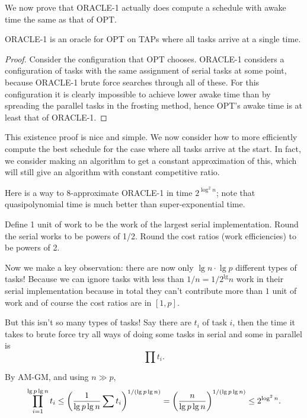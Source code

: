 We now prove that ORACLE-1 actually does compute a schedule with
awake time the same as that of OPT.
\begin{lemma}
  \label{lem:frosting} 
  ORACLE-1 is an oracle for OPT on TAPs where all tasks arrive at a single time.
\end{lemma}
\begin{proof}
  Consider the configuration that OPT chooses. ORACLE-1 considers
  a configuration of tasks with the same assignment of serial
  tasks at some point, because ORACLE-1 brute force searches
  through all of these. For this configuration it is clearly
  impossible to achieve lower awake time than by spreading the
  parallel tasks in the frosting method, hence OPT's awake time
  is at least that of ORACLE-1.
\end{proof}

This existence proof is nice and simple. We now consider how to
more efficiently compute the best schedule for the case where all
tasks arrive at the start. In fact, we consider making an
algorithm to get a constant approximation of this, which will
still give an algorithm with constant competitive ratio.


Here is a way to 8-approximate ORACLE-1 in time $2^{\log^2 n}$;
note that quasipolynomial time is much better than super-exponential time.

Define 1 unit of work to be the work of the largest serial
implementation.
Round the serial works to be powers of 1/2.
Round the cost ratios (work efficiencies) to be powers of 2. 

Now we make a key observation: there are now only 
$\lg n \cdot \lg p$ different types of tasks!
Because we can ignore tasks with less than $1/n = 1/2^\lg n$ work
in their serial implementation because in total they can't
contribute more than $1$ unit of work 
and of course the cost ratios are in $[1,p]$.

But this isn't so many types of tasks! 
Say there are $t_i$ of task $i$, 
then the time it takes to brute force try all ways of doing some tasks in serial and some in parallel is 
$$\prod t_i.$$

By AM-GM, and using $n \gg p$,
$$\prod_{i=1}^{\lg p \lg n} t_i \le \left( \frac{1}{\lg p \lg n}
\sum t_i \right)^{1/(\lg p \lg n)} = \left( \frac{n}{\lg p \lg
n} \right)^{1/(\lg p \lg n)}\le 2^{\log^2 n}.$$


